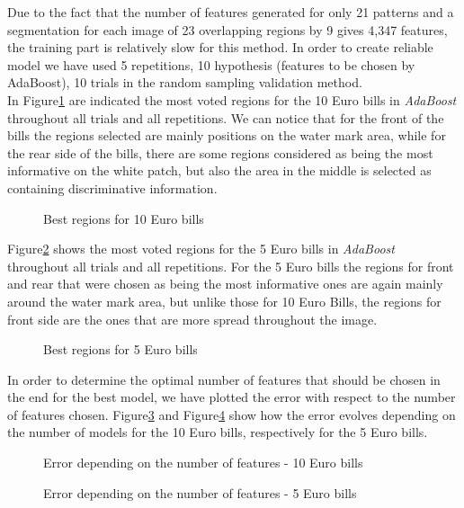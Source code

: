 \documentclass[11pt,twocolumn]{article}
\begin{document}
		\hspace*{10px}Due to the fact that the number of features generated for only
		21 patterns and a segmentation for each image of 23 overlapping regions by 9
		gives 4,347 features, the training part is relatively slow for this method. In
		order to create reliable model we have used 5 repetitions, 10 hypothesis
		(features to be chosen by AdaBoost), 10 trials in the random sampling
		validation method.\\ \hspace*{10px}In Figure\ref{haar_regions10} are
		indicated the most voted regions for the 10 Euro bills in \emph{AdaBoost}
		throughout all trials and all repetitions. We can notice that for the front of
		the bills the regions selected are mainly positions on the water mark area,
		while for the rear side of the bills, there are some regions considered as
		being the most informative on the white patch, but also the area in the middle
		is selected as containing discriminative information.\\ 
		\begin{figure}[!hbtp]
			\centering
			\caption{Best regions for 10 Euro bills}
			\label{haar_regions10}
		\end{figure}
		\hspace*{10px}Figure\ref{haar_regions5} shows the most voted regions for the 5
		Euro bills in \emph{AdaBoost} throughout all trials and all repetitions. For
		the 5 Euro bills the regions for front and rear that were chosen as being the
		most informative ones are again mainly around the water mark area, but unlike
		those for 10 Euro Bills, the regions for front side are the ones that are more
		spread throughout the image.\\ 
		\begin{figure}[!hbtp]
			\centering
			\caption{Best regions for 5 Euro bills}
			\label{haar_regions5}
		\end{figure} 
		\hspace*{10px}In order to determine the optimal number of features that should
		be chosen in the end for the best model, we have plotted the error with
		respect to the number of features chosen. Figure\ref{haar_plot10} and
		Figure\ref{haar_plot5} show how the error evolves depending on the number of
		models for the 10 Euro bills, respectively for the 5 Euro bills. 
		\begin{figure}[!hbtp]
			\centering
			\caption{Error depending on the number of features - 10 Euro bills}
			\label{haar_plot10}
		\end{figure} 
		\begin{figure}[!hbtp]
			\centering
			\caption{Error depending on the number of features - 5 Euro bills}
			\label{haar_plot5}
		\end{figure} 
	
\end{document}
